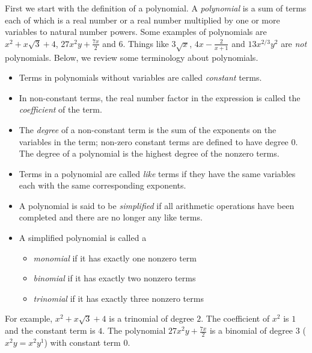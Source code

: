 \documentclass{ximera}
\begin{document}
First we start with the definition of a polynomial. A \emph{polynomial} is a sum of terms each of which is a real number or a real number multiplied by one or more variables to natural number powers. Some examples of polynomials are $x^2 + x\sqrt{3} + 4$, $27x^2y + \frac{7x}{2}$ and $6$. Things like $3\sqrt{x}$, $4x - \frac{2}{x+1}$ and $13x^{2/3}y^{2}$ are \emph{not} polynomials. Below, we review some terminology about polynomials.
\begin{definition}
    \begin{itemize}
        \item  Terms in polynomials without variables are called \emph{constant} terms.
        \item  In non-constant terms, the real number factor in the expression is called the \emph{coefficient} of the term. 
        \item  The \emph{degree} of a non-constant term is the sum of the exponents on the variables in the term; non-zero constant terms are defined to have degree $0$. The degree of a polynomial is the highest degree of the nonzero terms.
        \item  Terms in a polynomial are called \emph{like} terms if they have the same variables each with the same corresponding exponents.
        \item  A polynomial is said to be \emph{simplified} if all arithmetic operations have been completed and there are no longer any like terms.
        \item  A simplified polynomial  is  called a 
        \begin{itemize}
            \item   \emph{monomial} if it has exactly one nonzero term
            \item   \emph{binomial} if it has exactly two nonzero terms
            \item   \emph{trinomial} if it has exactly three nonzero terms
        \end{itemize}
    \end{itemize}
\end{definition}

For example, $x^2 + x\sqrt{3} +4$ is a trinomial of degree $2$.  The coefficient of $x^2$ is $1$ and the constant term is $4$.  The polynomial $27x^2y + \frac{7x}{2}$ is a binomial of degree $3$ ($x^2y = x^2 y^1$) with constant term $0$.  
\end{document}
